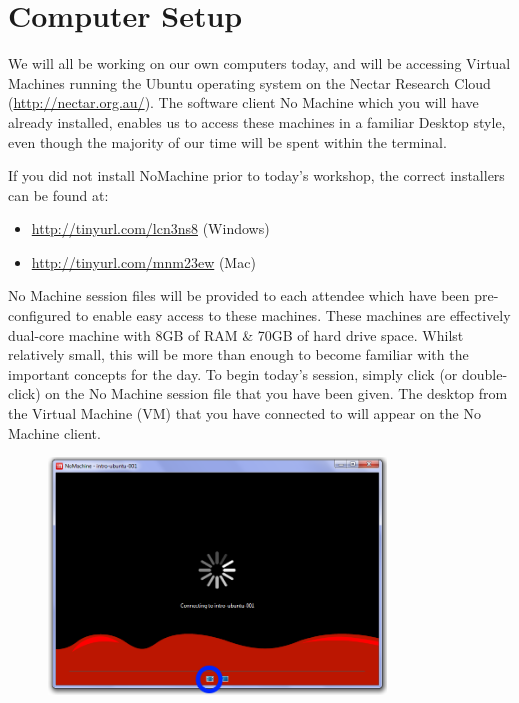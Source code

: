 \section{Computer Setup}
\begin{information}
We will all be working on our own computers today, and will be accessing Virtual Machines running the Ubuntu operating system on the Nectar Research Cloud (\url{http://nectar.org.au/}).
The software client No Machine which you will have already installed, enables us to access these machines in a familiar Desktop style, even though the majority of our time will be spent within the terminal. \\
\end{information}

\begin{warning}
If you did not install NoMachine prior to today's workshop, the correct installers can be found at:
\begin{itemize}
	\item \url{http://tinyurl.com/lcn3ns8} (Windows)
	\item \url{http://tinyurl.com/mnm23ew} (Mac)
\end{itemize}
\end{warning}

\begin{information}
No Machine session files will be provided to each attendee which have been pre-configured to enable easy access to these machines.
These machines are effectively dual-core machine with 8GB of RAM \& 70GB of hard drive space.
Whilst relatively small, this will be more than enough to become familiar with the important concepts for the day.
To begin today's session, simply click (or double-click) on the No Machine session file that you have been given.
The desktop from the Virtual Machine (VM) that you have connected to will appear on the
No Machine client. \\
\end{information}

\begin{figure}[h!]
  \centering
    \includegraphics[width=0.8\textwidth]{images/NoMachine.png}
\end{figure}

